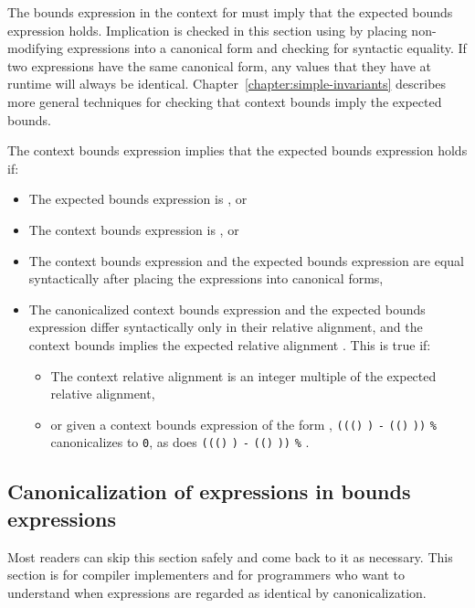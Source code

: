 The bounds expression in the context for  must imply that the
expected bounds expression holds. Implication is checked in this section
using by placing non-modifying expressions into a canonical form and
checking for syntactic equality. If two expressions have the same
canonical form, any values that they have at runtime will always be
identical. Chapter~\ref{chapter:simple-invariants}
describes more general techniques for checking
that context bounds imply the expected bounds.

The context bounds expression implies that the expected bounds
expression holds if:

\begin{itemize}
\item
  The expected bounds expression is \boundsnone, or
\item
  The context bounds expression is \boundsany, or
\item
  The context bounds expression and the expected bounds expression are
  equal syntactically after placing the expressions into canonical
  forms,
\item
  The canonicalized context bounds expression and the expected bounds
  expression differ syntactically only in their relative alignment, and
  the context bounds implies the expected relative alignment .
  This is true if:

  \begin{itemize}
  \item
    The context relative alignment is an integer multiple of the
    expected relative alignment,
  \item
    or given a context bounds expression of the form
    ,
    \texttt{(((\arrayptrchar)}
    \texttt{)} \texttt{-}
    \texttt{((\arrayptrchar)}
    \texttt{))} \texttt{\%}  canonicalizes to
    \texttt{0}, as does
    \texttt{(((\arrayptrchar)}
    \texttt{)} \texttt{-}
    \texttt{((\arrayptrchar)}
    \texttt{))} \texttt{\%} .
  \end{itemize}
\end{itemize}

 \subsection{Canonicalization of expressions in bounds expressions}\label{canonicalization-of-expressions-in-bounds-expressions}


Most readers can skip this section safely and come back to it as
necessary. This section is for compiler implementers and for programmers
who want to understand when expressions are regarded as identical by
canonicalization.

